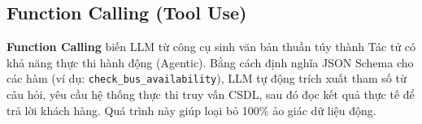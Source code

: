\subsection{Function Calling (Tool Use)}
\textbf{Function Calling} biến LLM từ công cụ sinh văn bản thuần túy thành Tác tử có khả năng thực thi hành động (Agentic). Bằng cách định nghĩa JSON Schema cho các hàm (ví dụ: \texttt{check\_bus\_availability}), LLM tự động trích xuất tham số từ câu hỏi, yêu cầu hệ thống thực thi truy vấn CSDL, sau đó đọc kết quả thực tế để trả lời khách hàng. Quá trình này giúp loại bỏ 100\% ảo giác dữ liệu động.

